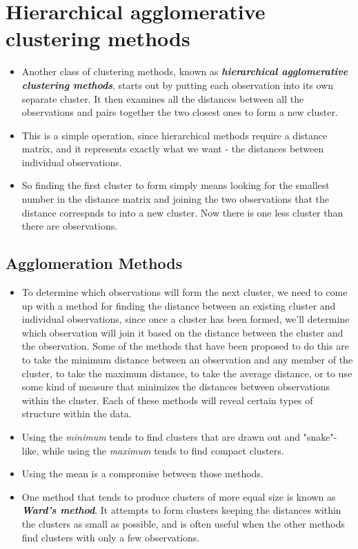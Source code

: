 \documentclass[RCluster.tex]{subfiles}
\begin{document}
\section{Hierarchical agglomerative clustering methods}
\begin{itemize}
\item Another class of clustering methods, known as \textbf{\textit{hierarchical agglomerative clustering methods}}, starts out by putting each observation into its own separate cluster. It then examines all the distances between all the observations and pairs together the two closest ones to form a new cluster. 
\item This is a simple operation, since hierarchical methods require a distance matrix, and it represents exactly what we want - the distances between individual observations. 
\item So finding the first cluster to form simply means looking for the smallest number in the distance matrix and joining the two observations that the distance correspnds to into a new cluster. Now there is one less cluster than there are observations. 
\end{itemize}
\subsection{Agglomeration Methods}
\begin{itemize}
\item To determine which observations will form the next cluster, we need to come up with a method for finding the distance between an existing cluster and individual observations, since once a cluster has been formed, we'll determine which observation will join it based on the distance between the cluster and the observation. Some of the methods that have been proposed to do this are to take the minimum distance between an observation and any member of the cluster, to take the maximum distance, to take the average distance, or to use some kind of measure that minimizes the distances between observations within the cluster. Each of these methods will reveal certain types of structure within the data. \item Using the \textit{minimum} tends to find clusters that are drawn out and "snake"-like, while using the \textit{maximum} tends to find compact clusters. 
\item Using the mean is a compromise between those methods.
\item One method that tends to produce clusters of more equal size is known as \textbf{\textit{Ward's method}}. It attempts to form clusters keeping the distances within the clusters as small as possible, and is often useful when the other methods find clusters with only a few observations. 

\end{itemize}
\end{document}
